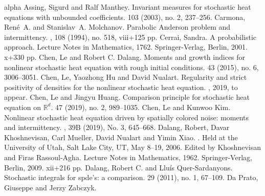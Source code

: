 \documentclass[a4paper,11pt]{article}%
\numberwithin{equation}{section}
\theoremstyle{plain}
\theoremstyle{definition}
\newcommand{\R}{\mathbb{R}}
\begin{document}
\begin{small}%
	\begin{thebibliography}{alpha}
		Assing, Sigurd and Ralf Manthey.
		\newblock Invariant measures for stochastic heat equations with unbounded coefficients.
		 103 (2003), no. 2, 237--256.
		Carmona, Ren\'e~A.  and Stanislav~A. Molchanov.
		\newblock Parabolic Anderson problem and intermittency.
		, 108 (1994), no. 518, viii+125 pp.
		Cerrai, Sandra.
		\newblock A probabilistic approach. Lecture Notes in Mathematics, 1762. Springer-Verlag, Berlin, 2001. x+330 pp.
		Chen, Le and Robert C. Dalang.
		\newblock Moments and growth indices for nonlinear stochastic heat equation with rough initial conditions.
		  43 (2015), no. 6, 3006--3051.
		Chen, Le, Yaozhong Hu and David Nualart.
		\newblock Regularity and strict positivity of densities for the nonlinear stochastic heat equation.
		, 2019, to appear.
		Chen, Le and Jingyu Huang.
		\newblock Comparison principle for stochastic heat equation on $\R^d$.
		  47 (2019), no. 2, 989--1035.
		Chen, Le and Kunwoo Kim.
		\newblock Nonlinear stochastic heat equation driven by spatially colored noise: moments and intermittency.
		, 39B (2019), No. 3, 645--668.
		Dalang, Robert, Davar Khoshnevisan, Carl Mueller, David Nualart and Yimin Xiao.
		.
		\newblock Held at the University of Utah, Salt Lake City, UT, May 8–19, 2006.  Edited by  Khoshnevisan and Firas Rassoul-Agha. Lecture Notes in Mathematics, 1962.
		\newblock Springer-Verlag, Berlin, 2009. xii+216 pp.
		Dalang, Robert C. and Llu\'is Quer-Sardanyons.
		\newblock Stochastic integrals for spde's: a comparison.
		 29 (2011), no. 1, 67--109.
		Da Prato, Giuseppe and Jerzy Zabczyk.

\end{thebibliography}
\end{small}
\end{document}
